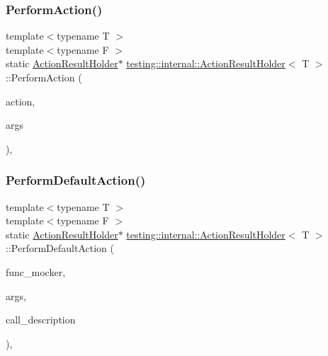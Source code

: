 \subsubsection{\texorpdfstring{Perform\+Action()}{PerformAction()}}
{\footnotesize\ttfamily template$<$typename T $>$ \\
template$<$typename F $>$ \\
static \hyperlink{classtesting_1_1internal_1_1_action_result_holder}{Action\+Result\+Holder}$\ast$ \hyperlink{classtesting_1_1internal_1_1_action_result_holder}{testing\+::internal\+::\+Action\+Result\+Holder}$<$ T $>$\+::Perform\+Action (\begin{DoxyParamCaption}\item[{const \hyperlink{classtesting_1_1_action}{Action}$<$ F $>$ \&}]{action,  }\item[{const typename \hyperlink{structtesting_1_1internal_1_1_function}{Function}$<$ F $>$\+::Argument\+Tuple \&}]{args }\end{DoxyParamCaption})\hspace{0.3cm}{\ttfamily [inline]}, {\ttfamily [static]}}

\mbox{\label{classtesting_1_1internal_1_1_action_result_holder_a9609dcb5fb16271f83d777b087075272}} 
\subsubsection{\texorpdfstring{Perform\+Default\+Action()}{PerformDefaultAction()}}
{\footnotesize\ttfamily template$<$typename T $>$ \\
template$<$typename F $>$ \\
static \hyperlink{classtesting_1_1internal_1_1_action_result_holder}{Action\+Result\+Holder}$\ast$ \hyperlink{classtesting_1_1internal_1_1_action_result_holder}{testing\+::internal\+::\+Action\+Result\+Holder}$<$ T $>$\+::Perform\+Default\+Action (\begin{DoxyParamCaption}\item[{const \hyperlink{classtesting_1_1internal_1_1_function_mocker_base}{Function\+Mocker\+Base}$<$ F $>$ $\ast$}]{func\+\_\+mocker,  }\item[{const typename \hyperlink{structtesting_1_1internal_1_1_function}{Function}$<$ F $>$\+::Argument\+Tuple \&}]{args,  }\item[{const \hyperlink{namespacetesting_1_1internal_a8e8ff5b11e64078831112677156cb111}{string} \&}]{call\+\_\+description }\end{DoxyParamCaption})\hspace{0.3cm}{\ttfamily [inline]}, {\ttfamily [static]}}

